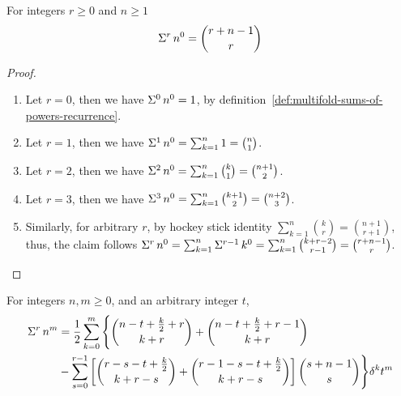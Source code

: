 \begin{lemma}
  \label{prop:multifold-sum-of-zero-powers}
  For integers $r \geq 0$ and $n\geq 1$
  \begin{align*}
    \Sigma^{r}\,{n}^{0} = \binom{r+n-1}{r}
  \end{align*}
  \begin{proof}
    \begin{enumerate}
      \item Let $r=0$, then we have $\Sigma^{0}\,{n}^{0} = 1$,
        by definition~\eqref{def:multifold-sums-of-powers-recurrence}.
      \item Let $r=1$, then we have
        $\Sigma^{1}\,{n}^{0}
        = \sum_{k=1}^{n} 1 = \binom{n}{1}$.
      \item Let $r=2$, then we have
        $\Sigma^{2}\,{n}^{0}
        = \sum_{k=1}^{n} \binom{k}{1}
        = \binom{n+1}{2}$.
      \item Let $r=3$, then we have
        $\Sigma^{3}\,{n}^{0}
        = \sum_{k=1}^{n} \binom{k+1}{2}
        = \binom{n+2}{3}$.
      \item Similarly, for arbitrary $r$, by hockey stick identity
        $\sum_{k=1}^{n} \binom{k}{r} = \binom{n+1}{r+1}$,
        thus, the claim follows
        $\Sigma^{r}\,{n}^{0}
        =  \sum_{k=1}^{n} \Sigma^{r-1}\,{k}^{0}
        =  \sum_{k=1}^{n} \binom{k+r-2}{r-1}
        = \binom{r+n-1}{r}$.
    \end{enumerate}
  \end{proof}
\end{lemma}

\begin{proposition}
  \label{prop:multifold-binomial-sums-of-powers}
  For integers $n,m \geq 0$, and an arbitrary integer $t$,
  \begin{align*}
    \Sigma^{r}\,{n}^{m}
    &= \frac{1}{2} \sum_{k=0}^{m}
    \Bigg \{
      \binom{n-t+\frac{k}{2}+r}{k+r} + \binom{n-t+\frac{k}{2}+r-1}{k+r} \\
      &-
      \sum_{s=0}^{r-1}
      \left[
        \binom{r-s-t+\frac{k}{2}}{k+r-s} + \binom{r-1-s-t+\frac{k}{2}}{k+r-s}
      \right] \binom{s+n-1}{s}
    \Bigg \} \delta^{k} t^m
  \end{align*}
\end{proposition}
